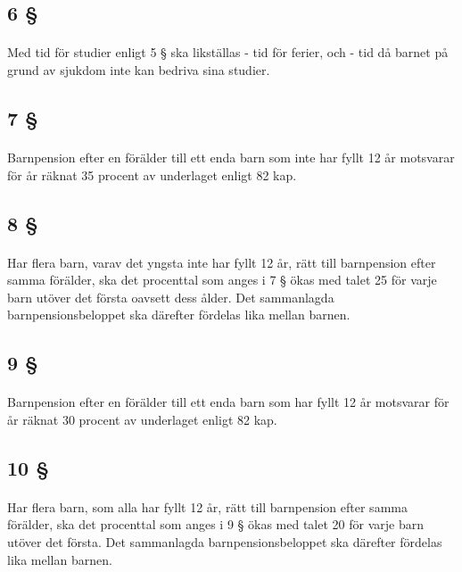 \documentclass[a4paper,notitlepage,openany,10pt]{book}
\begin{document}
\subsection*{6 §}
\paragraph*{}
Med tid för studier enligt 5 § ska likställas
\newline - tid för ferier, och
\newline - tid då barnet på grund av sjukdom inte kan bedriva sina studier.
\subsection*{7 §}
\paragraph*{}
Barnpension efter en förälder till ett enda barn som inte har fyllt 12 år motsvarar för år räknat 35 procent av underlaget enligt 82 kap.
\subsection*{8 §}
\paragraph*{}
Har flera barn, varav det yngsta inte har fyllt 12 år, rätt till barnpension efter samma förälder, ska det procenttal som anges i 7 § ökas med talet 25 för varje barn utöver det första oavsett dess ålder. Det sammanlagda barnpensionsbeloppet ska därefter fördelas lika mellan barnen.
\subsection*{9 §}
\paragraph*{}
Barnpension efter en förälder till ett enda barn som har fyllt 12 år motsvarar för år räknat 30 procent av underlaget enligt 82 kap.
\subsection*{10 §}
\paragraph*{}
Har flera barn, som alla har fyllt 12 år, rätt till barnpension efter samma förälder, ska det procenttal som anges i 9 § ökas med talet 20 för varje barn utöver det första. Det sammanlagda barnpensionsbeloppet ska därefter fördelas lika mellan barnen.
\end{document}
